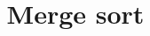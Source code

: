 \documentclass[12pt,bezier,amstex]{beamer}
\author{}
\date{}
\title{Merge sort}
\begin{document}
\begin{frame}
  \maketitle
\end{frame}

  
\end{document}
